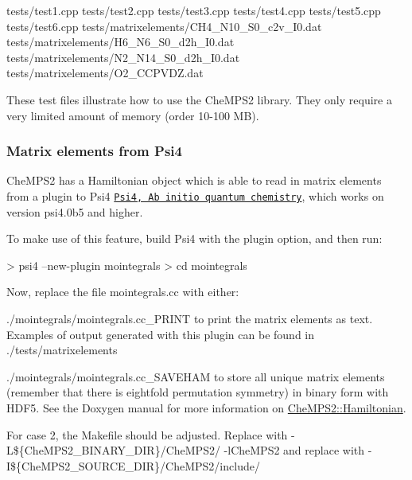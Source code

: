 \begin{DoxyVerb}tests/test1.cpp
tests/test2.cpp
tests/test3.cpp
tests/test4.cpp
tests/test5.cpp
tests/test6.cpp
tests/matrixelements/CH4_N10_S0_c2v_I0.dat
tests/matrixelements/H6_N6_S0_d2h_I0.dat
tests/matrixelements/N2_N14_S0_d2h_I0.dat
tests/matrixelements/O2_CCPVDZ.dat
\end{DoxyVerb}


These test files illustrate how to use the Che\-M\-P\-S2 library. They only require a very limited amount of memory (order 10-\/100 M\-B).

\subsubsection*{Matrix elements from Psi4}

Che\-M\-P\-S2 has a Hamiltonian object which is able to read in matrix elements from a plugin to Psi4 \href{http://www.psicode.org}{\tt Psi4, Ab initio quantum chemistry}, which works on version psi4.\-0b5 and higher.

To make use of this feature, build Psi4 with the plugin option, and then run\-: \begin{DoxyVerb}> psi4 --new-plugin mointegrals
> cd mointegrals
\end{DoxyVerb}


Now, replace the file {\ttfamily mointegrals.\-cc} with either\-:


\begin{DoxyEnumerate}
\item {\ttfamily ./mointegrals/mointegrals.cc\-\_\-\-P\-R\-I\-N\-T} to print the matrix elements as text. Examples of output generated with this plugin can be found in {\ttfamily ./tests/matrixelements}
\end{DoxyEnumerate}


\begin{DoxyEnumerate}
\item {\ttfamily ./mointegrals/mointegrals.cc\-\_\-\-S\-A\-V\-E\-H\-A\-M} to store all unique matrix elements (remember that there is eightfold permutation symmetry) in binary form with H\-D\-F5. See the Doxygen manual for more information on \hyperlink{classCheMPS2_1_1Hamiltonian}{Che\-M\-P\-S2\-::\-Hamiltonian}.
\end{DoxyEnumerate}

For case 2, the {\ttfamily Makefile} should be adjusted. Replace {\ttfamily } with {\ttfamily  -\/\-L\$\{Che\-M\-P\-S2\-\_\-\-B\-I\-N\-A\-R\-Y\-\_\-\-D\-I\-R\}/\-Che\-M\-P\-S2/ -\/l\-Che\-M\-P\-S2} and replace {\ttfamily } with {\ttfamily  -\/\-I\$\{Che\-M\-P\-S2\-\_\-\-S\-O\-U\-R\-C\-E\-\_\-\-D\-I\-R\}/\-Che\-M\-P\-S2/include/}

